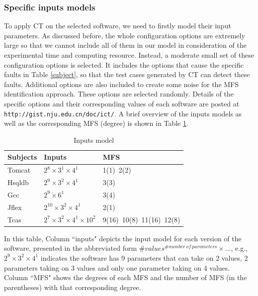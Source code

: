 \documentclass[10pt,journal,compsoc]{IEEEtran}
\begin{document}
\subsubsection{Specific inputs models}
To apply CT on the selected software, we need to firstly model their input parameters. As discussed before, the whole configuration options are extremely large so that we cannot include all of them in our model in consideration of the experimental time and computing resource. Instead, a moderate small set of these configuration options is selected.  It includes the options that cause the specific faults in Table \ref{subject}, so that the test cases generated by CT can detect these faults. Additional options are also included to create some noise for the MFS identification approach. These options are selected randomly. Details of the specific options and their corresponding values of each software are posted at \texttt{http://gist.nju.edu.cn/doc/ict/}.  A brief overview of the inputs models as well as the corresponding MFS (degree) is shown in Table \ref{inputs}.


\begin{table}[ht]
\caption{Inputs model }
\label{inputs}
\centering
\begin{tabular}{l|l|l}
\hline
Subjects & Inputs & MFS \\
\hline
Tomcat   &  $2^{8} \times 3^{1} \times 4^{1}$       & 1(1)\ 2(2)  \\
Hsqldb   &   $2^{9} \times 3^{2} \times 4^{1}$      &  3(3) \\
Gcc      &   $2^{9} \times 6^{1}$      &    3(4)  \\
Jflex    & $2^{10} \times 3^{2} \times 4^{1} $        &   2(1)   \\
Tcas     &  $2^{7} \times 3^{2} \times 4^{1} \times 10^{2} $ &9(16)\ 10(8)\ 11(16)\ 12(8) \\ \hline
\end{tabular}

\end{table}
In this table, Column ``inputs" depicts the input model for each version of the software, presented in the abbreviated form $\#values^{\#number\ of\ parameters} \times ...$, e.g., $2^{9} \times 3^{2} \times 4^{1}$ indicates the software has 9 parameters that can take on 2 values, 2 parameters taking on 3 values and only one parameter taking on 4 values. Column ``MFS" shows the degrees of each MFS and the number of MFS (in the parentheses) with that corresponding degree.
\end{document}
